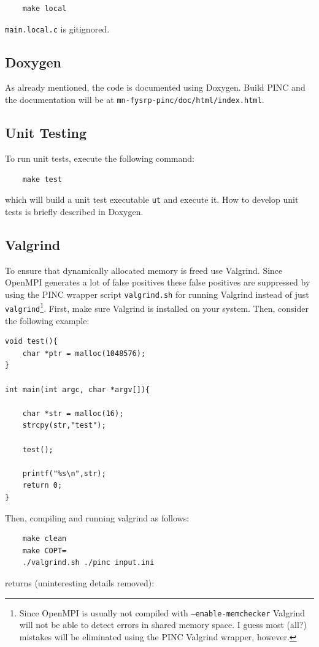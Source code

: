 \documentclass[10pt,a4paper]{article}
\begin{document}
\begin{verbatim}
	make local
\end{verbatim}
\verb$main.local.c$ is gitignored.

\subsection{Doxygen}
As already mentioned, the code is documented using Doxygen. Build PINC and the documentation will be at \verb$mn-fysrp-pinc/doc/html/index.html$.

\subsection{Unit Testing}
To run unit tests, execute the following command:

\begin{verbatim}
	make test
\end{verbatim}
which will build a unit test executable \verb$ut$ and execute it. How to develop unit tests is briefly described in Doxygen.

\subsection{Valgrind}
To ensure that dynamically allocated memory is freed use Valgrind. Since OpenMPI generates a lot of false positives these false positives are suppressed by using the PINC wrapper script \verb$valgrind.sh$ for running Valgrind instead of just \verb$valgrind$\footnote{Since OpenMPI is usually not compiled with \texttt{--enable-memchecker} Valgrind will not be able to detect errors in shared memory space. I guess most (all?) mistakes will be eliminated using the PINC Valgrind wrapper, however.}. First, make sure Valgrind is installed on your system. Then, consider the following example:

\begin{lstlisting}
void test(){
	char *ptr = malloc(1048576);
}

int main(int argc, char *argv[]){

	char *str = malloc(16);
	strcpy(str,"test");
	
	test();

	printf("%s\n",str);
	return 0;
}
\end{lstlisting}
Then, compiling and running valgrind as follows:

\begin{verbatim}
	make clean
	make COPT=
	./valgrind.sh ./pinc input.ini
\end{verbatim}
returns (uninteresting details removed):
\end{document}
